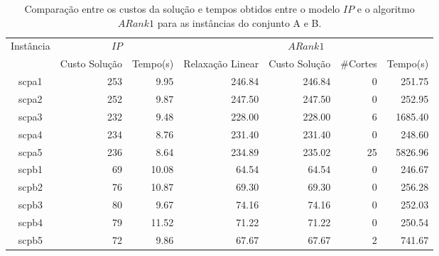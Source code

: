 \begin{table}[htbp]
\begin{center}
  \begin{tabular}{|c|r|r|r|r|r|r|}
    \hline
      Instância & \multicolumn{2}{|c|}{$IP$} & \multicolumn{4}{|c|}{$ARank1$}\\
                & Custo Solução    & Tempo(s)   & Relaxação Linear  & Custo Solução   & \#Cortes & Tempo(s)      \\ \hline
      scpa1     & 253              & 9.95      & 246.84          & 246.84          & 0          & 251.75  \\ \hline
      scpa2     & 252              & 9.87      & 247.50          & 247.50          & 0          & 252.95  \\ \hline
      scpa3     & 232              & 9.48      & 228.00          & 228.00          & 6          & 1685.40 \\ \hline
      scpa4     & 234              & 8.76      & 231.40          & 231.40          & 0          & 248.60  \\ \hline
      scpa5     & 236              & 8.64      & 234.89          & 235.02          & 25         & 5826.96 \\ \hline
      scpb1     & 69               & 10.08     & 64.54           & 64.54           & 0          & 246.67  \\ \hline
      scpb2     & 76               & 10.87     & 69.30           & 69.30           & 0          & 256.28  \\ \hline
      scpb3     & 80               & 9.67      & 74.16           & 74.16           & 0          & 252.03  \\ \hline
      scpb4     & 79               & 11.52     & 71.22           & 71.22           & 0          & 250.54  \\ \hline
      scpb5     & 72               & 9.86      & 67.67           & 67.67           & 2          & 741.67  \\ \hline
  \end{tabular}
\caption{Comparação entre os custos da solução e tempos obtidos entre o modelo $IP$ e o algoritmo $ARank1$ para as instâncias do conjunto A e B.}
\label{table:resultadosaeb}
\end{center}
\end{table}












